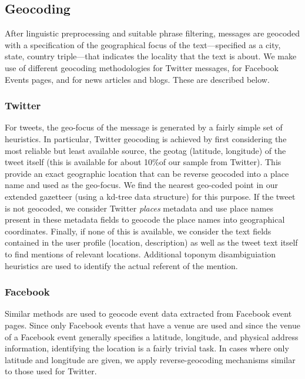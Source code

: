 \vspace{-0.5em}
\subsection{Geocoding}
\label{subsection:geocoding}
After linguistic preprocessing and suitable phrase filtering,
messages are geocoded with a
specification of the geographical focus of the text---specified as a
city, state, country triple---that indicates the locality that the
text is about. We make use of different geocoding methodologies
for Twitter messages, for Facebook Events pages, and for news articles and blogs.
These are described below.

\subsubsection{Twitter}
For tweets, the geo-focus of the message is generated by a fairly
simple set of heuristics.  In particular, Twitter
geocoding is achieved by first considering the most reliable but least
available source, the geotag (latitude, longitude) of the tweet itself (this is available
for about 10\%of our sample from Twitter). This provide an exact
geographic location that can be reverse geocoded into a place name
and used as the geo-focus. We find the nearest geo-coded point in
our extended gazetteer (using a kd-tree data structure) for this
purpose. If the tweet is not geocoded, we consider Twitter {\it places}
metadata and use place names present in these metadata fields to
geocode the place names into geographical coordinates. Finally, if
none of this is available, we consider the text fields contained in
the user profile (location, description) as well as the tweet text
itself to find mentions of relevant locations.  Additional toponym disambiguiation heuristics are used to
identify the actual referent of the mention.

\subsubsection{Facebook}
Similar methods are used to geocode event data extracted from Facebook event pages.  
Since only Facebook events that have a venue are used and since the
 venue of a Facebook event generally specifies a latitude, longitude, and physical address information, 
identifying the location is a fairly trivial task.  In cases where only latitude and longitude are given, 
we apply reverse-geocoding mechanisms similar to those used for Twitter.

